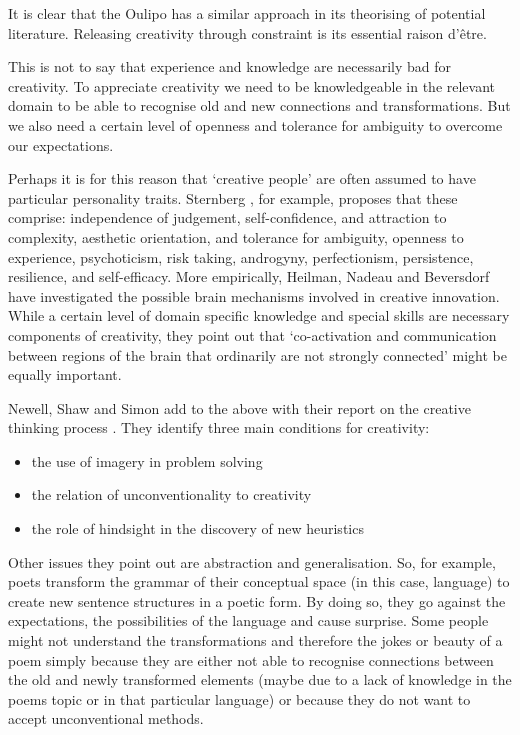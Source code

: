 \begin{leftbar}
It is clear that the Oulipo has a similar approach in its theorising of potential literature. Releasing creativity through constraint is its essential raison d'être.
\end{leftbar}

\begin{leftbar}
This is not to say that experience and knowledge are necessarily bad for creativity. To appreciate creativity we need to be knowledgeable in the relevant domain to be able to recognise old and new connections and transformations. But we also need a certain level of openness and tolerance for ambiguity to overcome our expectations.
\end{leftbar}

\begin{leftbar}
Perhaps it is for this reason that `creative people' are often assumed to have particular personality traits. Sternberg \autocite{Sternberg1999, Sternberg1999}, for example, proposes that these comprise: independence of judgement, self-confidence, and attraction to complexity, aesthetic orientation, and tolerance for ambiguity, openness to experience, psychoticism, risk taking, androgyny, perfectionism, persistence, resilience, and self-efficacy. More empirically, Heilman, Nadeau and Beversdorf \autocite{Heilman2003} have investigated the possible brain mechanisms involved in creative innovation. While a certain level of domain specific knowledge and special skills are necessary components of creativity, they point out that `co-activation and communication between regions of the brain that ordinarily are not strongly connected' might be equally important.
\end{leftbar}

\begin{leftbar}
Newell, Shaw and Simon add to the above with their report on the creative thinking process \autocite{Newell1963}. They identify three main conditions for creativity:
\end{leftbar}

\begin{itemize}
  \item the use of imagery in problem solving
  \item the relation of unconventionality to creativity
  \item the role of hindsight in the discovery of new heuristics
\end{itemize}

\begin{leftbar}
Other issues they point out are abstraction and generalisation. So, for example, poets transform the grammar of their conceptual space (in this case, language) to create new sentence structures in a poetic form. By doing so, they go against the expectations, the possibilities of the language and cause surprise. Some people might not understand the transformations and therefore the jokes or beauty of a poem simply because they are either not able to recognise connections between the old and newly transformed elements (maybe due to a lack of knowledge in the poems topic or in that particular language) or because they do not want to accept unconventional methods.
\end{leftbar}


